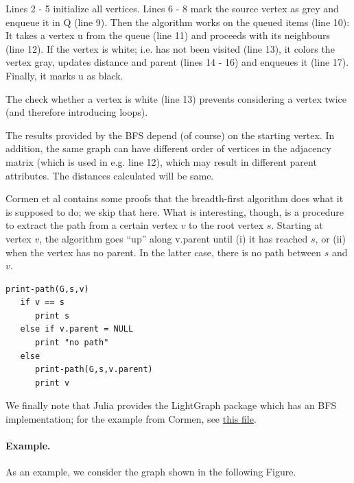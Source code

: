 Lines 2 - 5 initialize all vertices. Lines 6 - 8 mark the source vertex as grey and enqueue it in Q (line 9). Then the algorithm works on the queued items (line 10): It takes a vertex u from the queue (line 11) and proceeds with its neighbours (line 12). If the vertex is white; i.e. has not been visited (line 13), it colors the vertex gray, updates distance and parent (lines 14 - 16) and enqueues it (line 17). Finally, it marks u as black.

The check whether a vertex is white (line 13) prevents considering a vertex twice (and therefore introducing loops).

The results provided by the BFS depend (of course) on the starting vertex. In addition, the same graph can have different order of vertices in the adjacency matrix (which is used in e.g. line 12), which may result in different parent attributes. The distances calculated will be same.

Cormen et al contains some proofs that the breadth-first algorithm does what it is supposed to do; we skip that here. What is interesting, though, is a procedure to extract the path from a certain vertex $v$ to the root vertex $s$. Starting at vertex $v$, the algorithm goes ``up'' along v.parent until (i) it has reached $s$, or (ii) when the vertex has no parent. In the latter case, there is no path between $s$ and $v$.

\begin{verbatim}
print-path(G,s,v)
   if v == s
      print s
   else if v.parent = NULL
      print "no path"
   else
      print-path(G,s,v.parent)
      print v
\end{verbatim}

We finally note that Julia provides the LightGraph package which has an BFS implementation; for the example from Cormen, see \href{https://github.com/ClemensFMN/JuliaStuff/blob/master/Graphs/bfs_traversal.jl}{this file}.

\paragraph{Example.} As an example, we consider the graph shown in the following Figure.

